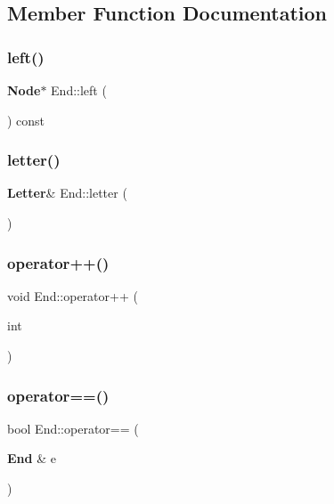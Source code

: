 \subsection{Member Function Documentation}
\mbox{\label{class_end_a4c27e829f73c99b0022b88c2c1730867}} 
\subsubsection{left()}
{\footnotesize\ttfamily \textbf{ Node}$\ast$ End\+::\+left (\begin{DoxyParamCaption}{ }\end{DoxyParamCaption}) const\hspace{0.3cm}{\ttfamily [inline]}}

\mbox{\label{class_end_a965fceb8e50a82e43bafe25b46fff325}} 
\subsubsection{letter()}
{\footnotesize\ttfamily \textbf{ Letter}\& End\+::letter (\begin{DoxyParamCaption}{ }\end{DoxyParamCaption})\hspace{0.3cm}{\ttfamily [inline]}}

\mbox{\label{class_end_aa1acae6e027fc01427b07afe58f44f09}} 
\subsubsection{operator++()}
{\footnotesize\ttfamily void End\+::operator++ (\begin{DoxyParamCaption}\item[{int}]{ }\end{DoxyParamCaption})\hspace{0.3cm}{\ttfamily [inline]}}

\mbox{\label{class_end_aacfada9eb004efb4d454b8357f3f8e1e}} 
\subsubsection{operator==()}
{\footnotesize\ttfamily bool End\+::operator== (\begin{DoxyParamCaption}\item[{\textbf{ End} \&}]{e }\end{DoxyParamCaption})\hspace{0.3cm}{\ttfamily [inline]}}

